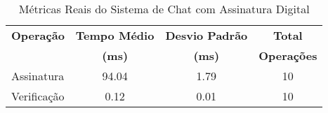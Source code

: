 \begin{table}[h]
\centering
\caption{Métricas Reais do Sistema de Chat com Assinatura Digital}
\label{tab:real_chat_metrics}
\begin{tabular}{|l|c|c|c|}
\hline
\textbf{Operação} & \textbf{Tempo Médio} & \textbf{Desvio Padrão} & \textbf{Total} \\
& \textbf{(ms)} & \textbf{(ms)} & \textbf{Operações} \\
\hline
Assinatura & 94.04 & 1.79 & 10 \\
Verificação & 0.12 & 0.01 & 10 \\
\hline
\end{tabular}
\end{table}